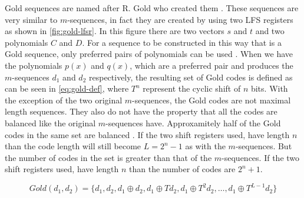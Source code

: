 		Gold sequences are named after R. Gold who created them \cite{1054106}.
		These sequences are very similar to $m$-sequences, in fact they are created by using two LFS registers as shown in \autoref{fig:gold-lfsr}.
		In this figure there are two vectors $s$ and $t$ and two polynomials $C$ and $D$.
		For a sequence to be constructed in this way that is a Gold sequence, only preferred pairs of polynomials can be used \cite{kedia2012comparative}.
		When we have the polynomials $p(x)$ and $q(x)$, which are a preferred pair and produces the $m$-sequences $d_1$ and $d_2$ respectively, the resulting set of Gold codes is defined as can be seen in \autoref{eq:gold-def}, where $T^n$ represent the cyclic shift of $n$ bits.
		With the exception of the two original $m$-sequences, the Gold codes are not maximal length sequences. 
		They also do not have the property that all the codes are balanced like the original $m$-sequences have.
		Approxamitely half of the Gold codes in the same set are balanced \cite{holmes2007spread}. %
		If the two shift registers used, have length $n$ than the code length will still become $L = 2^n - 1$ as with the $m$-sequences.
		But the number of codes in the set is greater than that of the $m$-sequences.
		If the two shift registers used, have length $n$ than the number of codes are $2^n + 1$.

		\begin{equation}
			\label{eq:gold-def}
			Gold(d_1, d_2) = \{ d_1, d_2, d_1 \oplus d_2, d_1 \oplus Td_2, d_1 \oplus T^2d_2, \dotsc, d_1 \oplus T^{L - 1}d_2 \}
		\end{equation}


